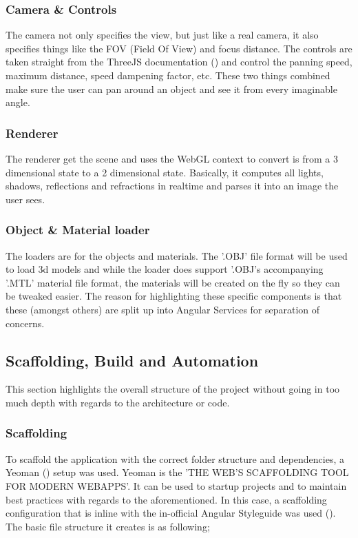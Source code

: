 \subsubsection{Camera \& Controls}
The camera not only specifies the view, but just like a real camera, it also specifies things like the FOV (Field Of View) and focus distance. The controls are taken straight from the ThreeJS documentation (\cite{ThreeJSgettingStarted}) and control the panning speed, maximum distance, speed dampening factor, etc. These two things combined make sure the user can pan around an object and see it from every imaginable angle.
\subsubsection{Renderer}
The renderer get the scene and uses the WebGL context to convert is from a 3 dimensional state to a 2 dimensional state. Basically, it computes all lights, shadows, reflections and refractions in realtime and parses it into an image the user sees.
\subsubsection{Object \& Material loader}
The loaders are for the objects and materials. The '.OBJ' file format will be used to load 3d models and while the loader does support '.OBJ's accompanying '.MTL' material file format, the materials will be created on the fly so they can be tweaked easier.
\newline
The reason for highlighting these specific components is that these (amongst others) are split up into Angular Services for separation of concerns.

\subsection{Scaffolding, Build and Automation}
This section highlights the overall structure of the project without going in too much depth with regards to the architecture or code.
\subsubsection{Scaffolding}
To scaffold the application with the correct folder structure and dependencies, a Yeoman (\cite{yeoman}) setup was used. Yeoman is the 'THE WEB'S SCAFFOLDING TOOL FOR MODERN WEBAPPS'. It can be used to startup projects and to maintain best practices with regards to the aforementioned. In this case, a scaffolding configuration that is inline with the in-official Angular Styleguide was used (\cite{johnPapa}). The basic file structure it creates is as following;

